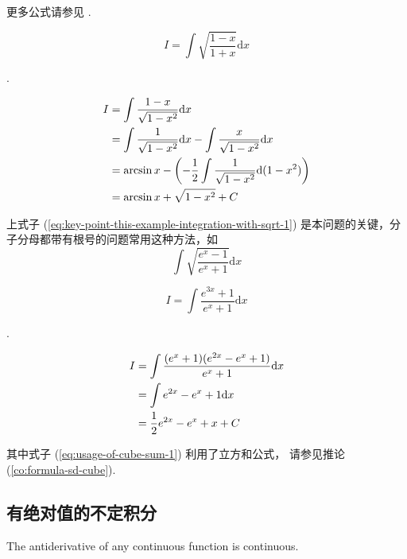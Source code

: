更多公式请参见 \cite[page 93, pdf 104]{we}.

\begin{example}
    \[
        I = \int \sqrt{\frac{1-x}{1+x}} \mathrm dx
    \]
    
    \cite[page 129, question 11]{yc}.

    \begin{align}
        I &= \int \frac{1-x}{\sqrt{1-x^2}} \mathrm dx \label{eq:key-point-this-example-integration-with-sqrt-1} \\
          &= \int \frac{1}{\sqrt{1 - x^2}} \mathrm dx - \int \frac{x}{\sqrt{1 - x^2}} \mathrm dx \notag \\
          &= \arcsin x - \left(-\frac{1}{2} \int \frac{1}{\sqrt{1-x^2}} \mathrm d(1-x^2)\right) \notag \\ 
          &= \arcsin x + \sqrt{1 - x^2} + C \notag
    \end{align}

    上式子 (\ref{eq:key-point-this-example-integration-with-sqrt-1}) 
    是本问题的关键，分子分母都带有根号的问题常用这种方法，如
    \[
        \int \sqrt{\dfrac{e^x - 1}{e^x + 1}} \mathrm dx
    \]
\end{example}

\begin{example}
    \[
        I = \int \dfrac{e^{3x} + 1}{e^x + 1} \mathrm dx
    \]

    \cite[page 130, question 21]{yc}.

    \begin{align}
        I &= \int \dfrac{(e^x + 1)(e^{2x} - e^x + 1)}{e^x + 1} \mathrm dx \label{eq:usage-of-cube-sum-1}\\
          &= \int e^{2x} - e^x + 1 \mathrm dx \notag \\
          &= \frac{1}{2} e^{2x} - e^x + x+ C \notag
    \end{align}

    其中式子 (\ref{eq:usage-of-cube-sum-1}) 利用了立方和公式，
    请参见推论 (\ref{co:formula-sd-cube}).
\end{example}

\subsection{有绝对值的不定积分}

\begin{theorem}
    \label{thm:i-dont-know-how-to-name-this-theorem-2}
    The antiderivative of any continuous function is continuous.
\end{theorem}


